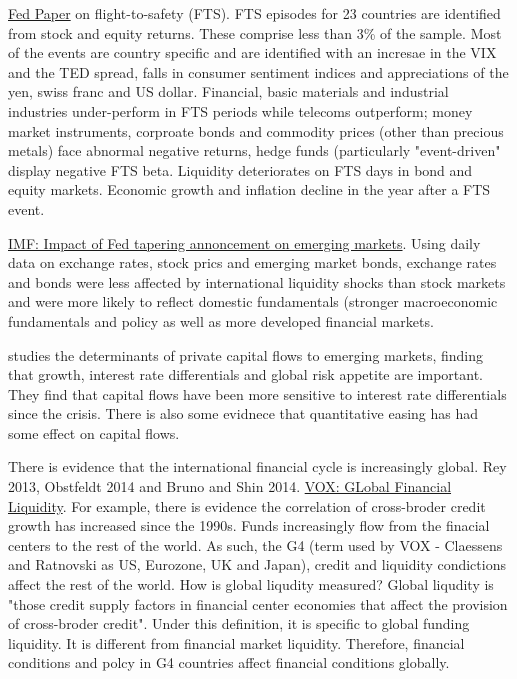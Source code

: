 \documentclass[12pt, a4paper, oneside]{article} %
\begin{document}
\href{http://www.federalreserve.gov/pubs/feds/2014/201446/201446abs.html}{Fed Paper} on flight-to-safety (FTS).  FTS episodes for 23 countries are identified from stock and equity returns.  These comprise less than 3\% of the sample.  Most of the events are country specific and are identified with an incresae in the VIX and the TED spread, falls in consumer sentiment indices and appreciations of the yen, swiss franc and US dollar. Financial, basic materials and industrial industries under-perform in FTS periods while telecoms outperform; money market instruments, corproate bonds and commodity prices (other than precious metals) face abnormal negative returns, hedge funds (particularly "event-driven" display negative FTS beta.  Liquidity deteriorates on FTS days in bond and equity markets. Economic growth and inflation decline in the year after a FTS event. 

\href{http://www.imf.org/external/pubs/cat/longres.aspx?sk=41655.0}{IMF:  Impact of Fed tapering annoncement on emerging markets}.  Using daily data on exchange rates, stock prics and emerging market bonds, exchange rates and bonds were less affected by international liquidity shocks than stock markets and were more likely to reflect domestic fundamentals (stronger macroeconomic fundamentals and policy as well as more developed financial markets. 

\citet{Ahmed2014} studies the determinants of private capital flows to emerging markets, finding that growth, interest rate differentials and global risk appetite are important.  They find that capital flows have been more sensitive to interest rate differentials since the crisis. There is also some evidnece that quantitative easing has had some effect on capital flows. 

There is evidence that the international financial cycle is increasingly global.  Rey 2013, Obstfeldt 2014 and Bruno and Shin 2014.  \href{http://www.voxeu.org/article/primer-global-liquidity}{VOX: GLobal Financial Liquidity}. For example, there is evidence the correlation of cross-broder credit growth has increased since the 1990s. Funds increasingly flow from the finacial centers to the rest of the world. As such, the G4 (term used by VOX - Claessens and Ratnovski as US, Eurozone, UK and Japan), credit and liquidity condictions affect the rest of the world. How is global liqudity measured? Global liqudity is "those credit supply factors in financial center economies that affect the provision of cross-broder credit".  Under this definition, it is specific to global funding liquidity. It is different from financial market liquidity. Therefore, financial conditions and polcy in G4 countries affect financial conditions globally. 
\end{document}
